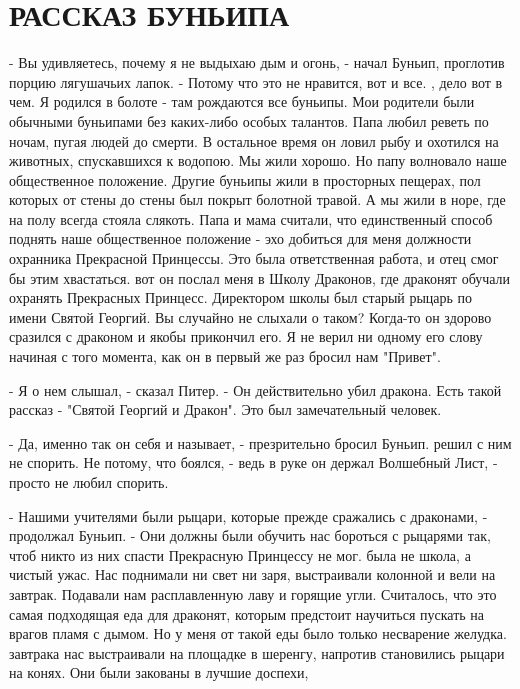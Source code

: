 \chapter{РАССКАЗ БУНЬИПА}
\par\par- Вы удивляетесь, почему я не выдыхаю дым и огонь, - начал Буньип, 
проглотив порцию лягушачьих лапок. - Потому что это не нравится, вот и 
все.
, дело вот в чем. Я родился в болоте - там рождаются все 
буньипы. Мои родители были обычными буньипами без каких-либо особых 
талантов. Папа любил реветь по ночам, пугая людей до смерти. В 
остальное время он ловил рыбу и охотился на животных, спускавшихся к 
водопою. Мы жили хорошо. Но папу волновало наше общественное 
положение. Другие буньипы жили в просторных пещерах, пол которых от 
стены до стены был покрыт болотной травой. А мы жили в норе, где на 
полу всегда стояла слякоть. Папа и мама считали, что единственный 
способ поднять наше общественное положение - эхо добиться для меня 
должности охранника Прекрасной Принцессы. Это была ответственная 
работа, и отец смог бы этим хвастаться.
 вот он послал меня в Школу Драконов, где драконят обучали 
охранять Прекрасных Принцесс. Директором школы был старый рыцарь по 
имени Святой Георгий. Вы случайно не слыхали о таком? Когда-то он 
здорово сразился с драконом и якобы прикончил его. Я не верил ни 
одному его слову начиная с того момента, как он в первый же раз бросил 
нам "Привет".
\par- Я о нем слышал, - сказал Питер. - Он действительно убил дракона. 
Есть такой рассказ - "Святой Георгий и Дракон". Это был замечательный 
человек.
\par- Да, именно так он себя и называет, - презрительно бросил Буньип.
 решил с ним не спорить. Не потому, что боялся, - ведь в руке 
он держал Волшебный Лист, - просто не любил спорить.
\par- Нашими учителями были рыцари, которые прежде сражались с 
драконами, - продолжал Буньип. - Они должны были обучить нас бороться 
с рыцарями так, чтоб никто из них спасти Прекрасную Принцессу не мог.
 была не школа, а чистый ужас. Нас поднимали ни свет ни заря, 
выстраивали колонной и вели на завтрак. Подавали нам расплавленную 
лаву и горящие угли. Считалось, что это самая подходящая еда для 
драконят, которым предстоит научиться пускать на врагов пламя с дымом. 
Но у меня от такой еды было только несварение желудка.
 завтрака нас выстраивали на площадке в шеренгу, напротив 
становились рыцари на конях. Они были закованы в лучшие доспехи, 
